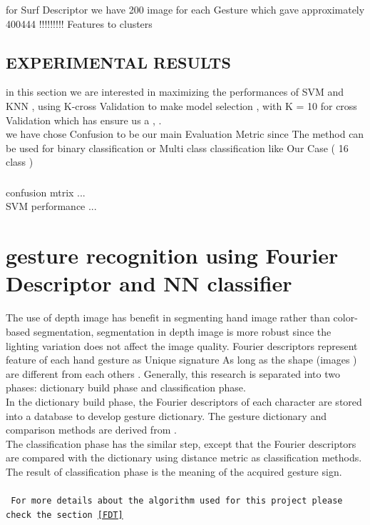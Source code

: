 for Surf Descriptor we have 200 image for each Gesture  which gave approximately 400444 !!!!!!!!! Features to clusters 

\subsection{EXPERIMENTAL RESULTS }\label{resultssvm}
in this section we are interested in maximizing the performances of SVM and KNN , using K-cross Validation to make model selection , with  K = 10 for cross Validation which has ensure us a   ,  . \\
we have chose Confusion to be our main Evaluation Metric since The method can be used for binary classification or Multi class classification like Our Case ( 16 class ) 

\subsubsection{ } 

confusion mtrix ...\\
SVM performance ...

\newpage





\section{gesture recognition using Fourier Descriptor and NN  classifier }

 The use of depth image has benefit
in segmenting hand image rather than color-based
segmentation, segmentation in depth image is more robust
since the lighting variation does not affect the image quality.
 Fourier descriptors represent feature of each hand gesture as Unique signature As long as the shape (images ) are different from each others .
Generally, this research is separated into two phases:
dictionary build phase and classification phase. \\In the
dictionary build phase, the Fourier descriptors of each
character are stored into a database to develop gesture
dictionary. The gesture dictionary and comparison methods are
derived from \cite{clif}.\\ The classification phase has the similar
step, except that the Fourier descriptors are compared with the
dictionary using distance metric as classification methods.
The result of classification phase is the meaning of the
acquired gesture sign.\\\\
\texttt{
For more details about the algorithm used for this project please check the section \ref{FDT}
}


